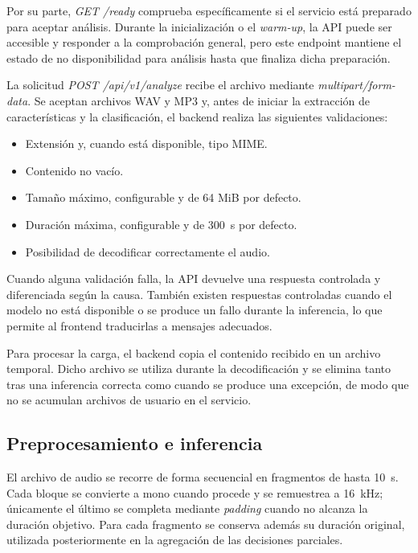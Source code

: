 Por su parte, \textit{GET /ready} comprueba específicamente si el servicio está preparado para aceptar análisis. Durante la inicialización o el \textit{warm-up}, la API puede ser accesible y responder a la comprobación general, pero este endpoint mantiene el estado de no disponibilidad para análisis hasta que finaliza dicha preparación.

La solicitud \textit{POST /api/v1/analyze} recibe el archivo mediante \textit{multipart/form-data}. Se aceptan archivos WAV y MP3 y, antes de iniciar la extracción de características y la clasificación, el backend realiza las siguientes validaciones:

\begin{itemize}
    \item Extensión y, cuando está disponible, tipo MIME.
    \item Contenido no vacío.
    \item Tamaño máximo, configurable y de 64 MiB por defecto.
    \item Duración máxima, configurable y de 300~s por defecto.
    \item Posibilidad de decodificar correctamente el audio.
\end{itemize}

Cuando alguna validación falla, la API devuelve una respuesta controlada y diferenciada según la causa. También existen respuestas controladas cuando el modelo no está disponible o se produce un fallo durante la inferencia, lo que permite al frontend traducirlas a mensajes adecuados.

Para procesar la carga, el backend copia el contenido recibido en un archivo temporal. Dicho archivo se utiliza durante la decodificación y se elimina tanto tras una inferencia correcta como cuando se produce una excepción, de modo que no se acumulan archivos de usuario en el servicio.

\subsection{Preprocesamiento e inferencia}

El archivo de audio se recorre de forma secuencial en fragmentos de hasta 10~s. Cada bloque se convierte a mono cuando procede y se remuestrea a 16~kHz; únicamente el último se completa mediante \textit{padding} cuando no alcanza la duración objetivo. Para cada fragmento se conserva además su duración original, utilizada posteriormente en la agregación de las decisiones parciales.

